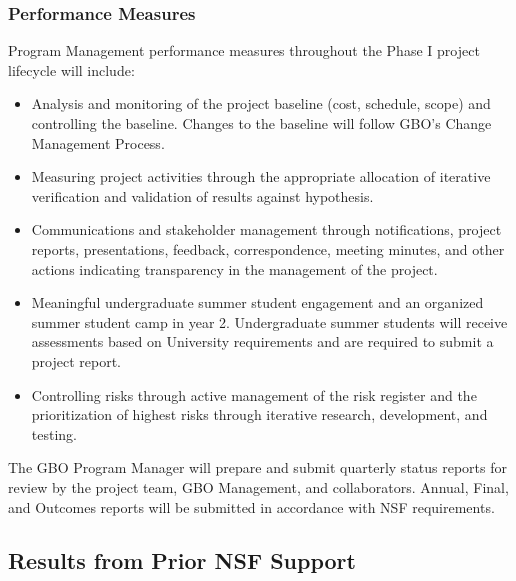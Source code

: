 \documentclass[10pt]{myNSF}
\begin{document}
\subsubsection{Performance Measures}
\label{sec:performance_measures}

Program Management performance measures throughout the Phase {\sc I}
project lifecycle will include:
\begin{itemize}
\item{Analysis and monitoring of the project baseline (cost, schedule,
    scope) and controlling the baseline.  Changes to the baseline will
    follow GBO's Change Management Process.}
\item{Measuring project activities through the appropriate allocation
    of iterative verification and validation of results against
    hypothesis.}
\item{Communications and stakeholder management through notifications,
    project reports, presentations, feedback, correspondence, meeting
    minutes, and other actions indicating transparency in the
    management of the project.}
\item{Meaningful undergraduate summer student engagement and an
    organized summer student camp in year 2. Undergraduate summer
    students will receive assessments based on University requirements
    and are required to submit a project report.}
\item{Controlling risks through active management of the risk register
    and the prioritization of highest risks through iterative
    research, development, and testing.}
\end{itemize}
The GBO Program Manager will prepare and submit quarterly status
reports for review by the project team, GBO Management, and
collaborators. Annual, Final, and Outcomes reports will be submitted
in accordance with NSF requirements.


\subsection{Results from Prior NSF Support}
\label{sec:prior_support}
\end{document}
